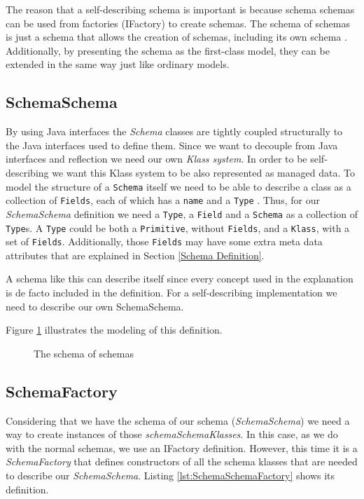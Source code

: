 The reason that a self-describing schema is important is because schema schemas can be used from factories (IFactory) to create schemas.
The schema of schemas is just a schema that allows the creation of schemas, including its own schema \cite{storm2012object}.
Additionally, by presenting the schema as the first-class model\cite{kurtev2006model}, they can be extended in the same way just like ordinary models.

\subsection{SchemaSchema}\label{sec:SchemaSchema}
By using Java interfaces the \textit{Schema} classes are tightly coupled structurally to the Java interfaces used to define them.
Since we want to decouple from Java interfaces and reflection we need our own \textit{Klass system}.
In order to be self-describing we want this Klass system to be also represented as managed data. 
To model the structure of a \texttt{Schema} itself we need to be able to describe a class as a collection of \texttt{Fields}, each of which has a \texttt{name} and a \texttt{Type} \cite{loh2012managed}. 
Thus, for our \textit{SchemaSchema} definition we need a \texttt{Type}, a \texttt{Field} and a \texttt{Schema} as a collection of \texttt{Type}s. 
A \texttt{Type} could be both a \texttt{Primitive}, without \texttt{Fields}, and a \texttt{Klass}, with a set of \texttt{Fields}.
Additionally, those \texttt{Fields} may have some extra meta data attributes that are explained in Section \ref{Schema Definition}.

A schema like this can describe itself since every concept used in the explanation is de facto included in the definition.
For a self-describing implementation we need to describe our own SchemaSchema. 

Figure \ref{fig:SchemaSchema_definition} illustrates the modeling of this definition.

\begin{figure}[H]
	\centering
  	\caption{The schema of schemas}
  	\label{fig:SchemaSchema_definition}
\end{figure}

\subsection{SchemaFactory}\label{sec:SchemaFactory}
Considering that we have the schema of our schema (\textit{SchemaSchema}) we need a way to create instances of those \textit{schemaSchemaKlasses}.
In this case, as we do with the normal schemas, we use an IFactory definition.
However, this time it is a \textit{SchemaFactory} that defines constructors of all the schema klasses that are needed to describe our \textit{SchemaSchema}.
Listing \ref{lst:SchemaSchemaFactory} shows its definition.

